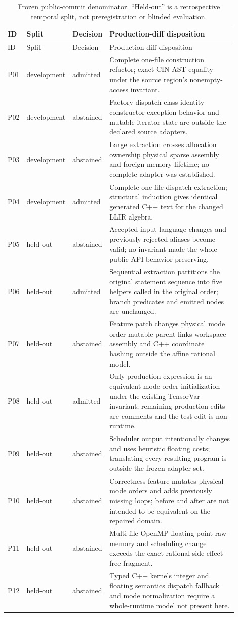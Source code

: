 \begin{longtable}{@{}p{0.055\linewidth}p{0.13\linewidth}p{0.13\linewidth}p{0.585\linewidth}@{}}
\caption{Frozen public-commit denominator. ``Held-out'' is a retrospective temporal split, not preregistration or blinded evaluation.}\label{tab:public-corpus}\\
\toprule ID & Split & Decision & Production-diff disposition\\\midrule\endfirsthead
\toprule ID & Split & Decision & Production-diff disposition\\\midrule\endhead
\bottomrule\endfoot
P01 & development & admitted & Complete one-file construction refactor; exact CIN AST equality under the source region's nonempty-access invariant.\\
P02 & development & abstained & Factory dispatch class identity constructor exception behavior and mutable iterator state are outside the declared source adapters.\\
P03 & development & abstained & Large extraction crosses allocation ownership physical sparse assembly and foreign-memory lifetime; no complete adapter was established.\\
P04 & development & admitted & Complete one-file dispatch extraction; structural induction gives identical generated C++ text for the changed LLIR algebra.\\
P05 & held-out & abstained & Accepted input language changes and previously rejected aliases become valid; no invariant made the whole public API behavior preserving.\\
P06 & held-out & admitted & Sequential extraction partitions the original statement sequence into five helpers called in the original order; branch predicates and emitted nodes are unchanged.\\
P07 & held-out & abstained & Feature patch changes physical mode order mutable parent links workspace assembly and C++ coordinate hashing outside the affine rational model.\\
P08 & held-out & admitted & Only production expression is an equivalent mode-order initialization under the existing TensorVar invariant; remaining production edits are comments and the test edit is non-runtime.\\
P09 & held-out & abstained & Scheduler output intentionally changes and uses heuristic floating costs; translating every resulting program is outside the frozen adapter set.\\
P10 & held-out & abstained & Correctness feature mutates physical mode orders and adds previously missing loops; before and after are not intended to be equivalent on the repaired domain.\\
P11 & held-out & abstained & Multi-file OpenMP floating-point raw-memory and scheduling change exceeds the exact-rational side-effect-free fragment.\\
P12 & held-out & abstained & Typed C++ kernels integer and floating semantics dispatch fallback and mode normalization require a whole-runtime model not present here.\\
\end{longtable}
